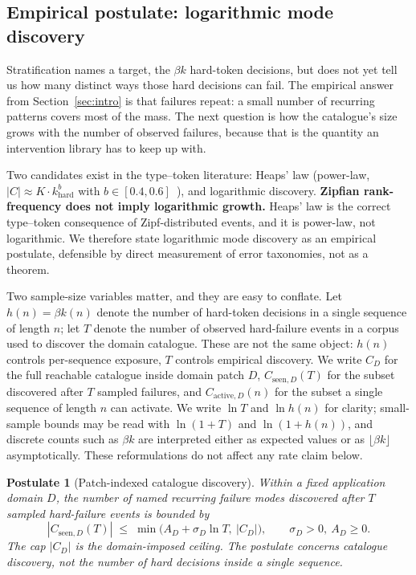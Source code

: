 \documentclass{article}
\theoremstyle{taeplain}
\theoremstyle{taedefn}
\newtheorem{postulate}{Postulate}
\begin{document}
\subsection{Empirical postulate: logarithmic mode discovery}
\label{sec:postulate}

Stratification names a target, the $\beta k$ hard-token decisions, but does not yet tell us how many distinct ways those hard decisions can fail. The empirical answer from Section~\ref{sec:intro} is that failures repeat: a small number of recurring patterns covers most of the mass. The next question is how the catalogue's size grows with the number of observed failures, because that is the quantity an intervention library has to keep up with.

Two candidates exist in the type--token literature: Heaps' law (power-law, $|C| \approx K \cdot k_{\text{hard}}^{b}$ with $b \in [0.4, 0.6]$~\citep{manning2008ir}), and logarithmic discovery. \textbf{Zipfian rank-frequency does not imply logarithmic growth.} Heaps' law is the correct type--token consequence of Zipf-distributed events, and it is power-law, not logarithmic. We therefore state logarithmic mode discovery as an empirical postulate, defensible by direct measurement of error taxonomies, not as a theorem.

Two sample-size variables matter, and they are easy to conflate. Let $h(n) = \beta k(n)$ denote the number of hard-token decisions in a single sequence of length $n$; let $T$ denote the number of observed hard-failure events in a corpus used to discover the domain catalogue. These are not the same object: $h(n)$ controls per-sequence exposure, $T$ controls empirical discovery. We write $C_D$ for the full reachable catalogue inside domain patch $D$, $C_{\text{seen},D}(T)$ for the subset discovered after $T$ sampled failures, and $C_{\text{active},D}(n)$ for the subset a single sequence of length $n$ can activate. We write $\ln T$ and $\ln h(n)$ for clarity; small-sample bounds may be read with $\ln(1+T)$ and $\ln(1+h(n))$, and discrete counts such as $\beta k$ are interpreted either as expected values or as $\lfloor \beta k \rfloor$ asymptotically. These reformulations do not affect any rate claim below.

\begin{postulate}[Patch-indexed catalogue discovery]\label{post:logmode}
Within a fixed application domain $D$, the number of named recurring failure modes discovered after $T$ sampled hard-failure events is bounded by
\[
|C_{\text{seen},D}(T)| \;\leq\; \min\bigl(A_D + \sigma_D \ln T,\ |C_D|\bigr), \qquad \sigma_D > 0,\ A_D \geq 0.
\]
The cap $|C_D|$ is the domain-imposed ceiling. The postulate concerns catalogue \emph{discovery}, not the number of hard decisions inside a single sequence.
\end{postulate}
\end{document}
